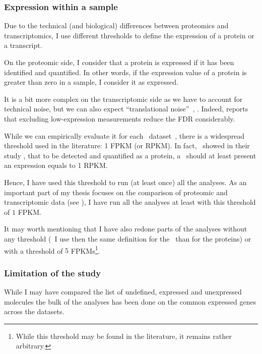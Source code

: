 \subsubsection{Expression within a sample}
Due to the technical (and biological) differences between proteomics and
transcriptomics, I use different thresholds to define the expression of a protein
or a transcript.

On the proteomic side, I consider that a protein is expressed if it has been
identified and quantified. In other words, if the expression value of a protein
is greater than zero in a sample, I consider it as expressed.

\label{subsubsec:exprTrans}
It is a bit more complex on the transcriptomic side as
we have to account for technical noise,
but we can also expect \enquote{translational noise}~,
.
Indeed, \cite{seqcmaqc} reports that
excluding low-expression measurements reduce the \gls{FDR} considerably.

While we can empirically evaluate it for each \Rnaseq\
dataset~,
there is a widespread threshold used in the literature:
1 \gls{FPKM} (or \gls{RPKM}).
In fact,~\citet{Hebenstreit:2011} showed in their study
,
that to be detected and quantified as a protein,
a \mRNA\ should at least present an expression equals to 1 \gls{RPKM}.

Hence, I have used this threshold to run (at least once) all the analyses.
As an important part of my thesis focuses on
the comparison of proteomic and transcriptomic data (see ),
I have run all the analyses at least with this threshold of $1$ \gls{FPKM}.

It may worth mentioning that I have also redone parts of the analyses without
any threshold (\ie\ I use then the same definition for the \mRNAs\ than for the
proteins) or with a threshold of $5$ \glspl{FPKM}\footnote{While this threshold
may be found in the literature, it remains rather arbitrary.}.

\subsubsection{Limitation of the study}
While I may have compared the list of
undefined, expressed and unexpressed molecules
the bulk of the analyses has been done on the common expressed genes across
the datasets.


